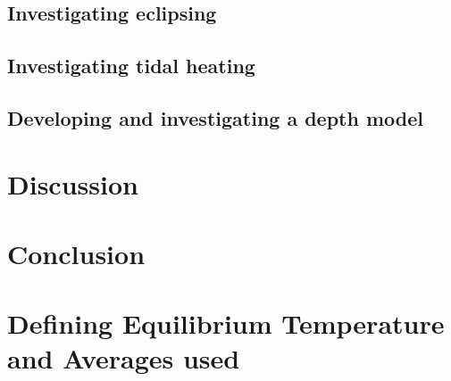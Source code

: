 \documentclass[12pt, onecolumn]{revtex4-2}    %
\begin{document}
\subsection{Investigating eclipsing} \label{ssec:InvEclipsing}
\subsection{Investigating tidal heating} \label{ssec:InvTidalHeating}
\subsection{Developing and investigating a depth model} \label{ssec:DevInvDepthModel} %

\section{Discussion} \label{sec:Discussion}

\section{Conclusion} \label{sec:Conclusion}






\clearpage

\appendix

\section{Defining Equilibrium Temperature and Averages used} \label{appx:EquilTempAverages}
\end{document}
